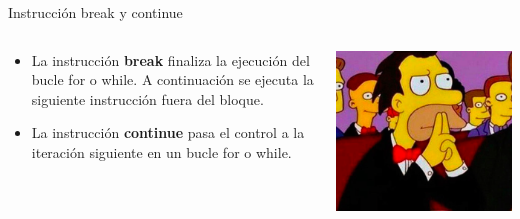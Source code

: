 \documentclass{bredelebeamer}
\begin{document}
\begin{frame}{Instrucción break y continue}
\begin{columns}
\begin{column}{0.5\textwidth}
\begin{itemize}
\item La instrucción \textbf{break} finaliza la ejecución del bucle for o while. A continuación se ejecuta la siguiente instrucción fuera del bloque.
\item La instrucción \textbf{continue} pasa el control a la iteración siguiente en un bucle for o while.
\end{itemize}
\end{column}
\begin{column}{0.5\textwidth}
\begin{center}
\includegraphics[scale=0.3]{images/img40.png}
\end{center}
\end{column}
\end{columns}
\end{frame}
\end{document}
